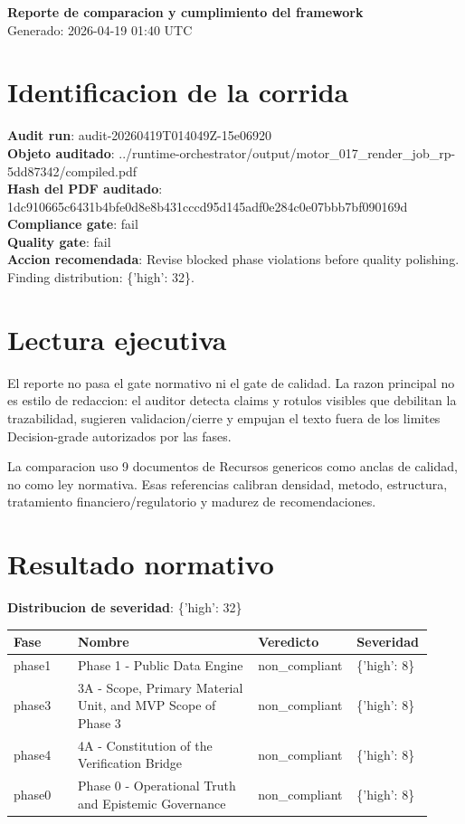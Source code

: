\documentclass[11pt]{article}
\begin{document}
\begin{center}
{\Large \textbf{Reporte de comparacion y cumplimiento del framework}}\\
\vspace{4pt}
Generado: 2026-04-19 01:40 UTC
\end{center}
\section*{Identificacion de la corrida}
\textbf{Audit run}: audit-20260419T014049Z-15e06920\\
\textbf{Objeto auditado}: ../runtime-orchestrator/output/motor\_017\_render\_job\_rp-5dd87342/compiled.pdf\\
\textbf{Hash del PDF auditado}: 1dc910665c6431b4bfe0d8e8b431cccd95d145adf0e284c0e07bbb7bf090169d\\
\textbf{Compliance gate}: fail\\
\textbf{Quality gate}: fail\\
\textbf{Accion recomendada}: Revise blocked phase violations before quality polishing. Finding distribution: \{'high': 32\}.\\
\section*{Lectura ejecutiva}
El reporte no pasa el gate normativo ni el gate de calidad. La razon principal no es estilo de redaccion: el auditor detecta claims y rotulos visibles que debilitan la trazabilidad, sugieren validacion/cierre y empujan el texto fuera de los limites Decision-grade autorizados por las fases.

La comparacion uso 9 documentos de Recursos genericos como anclas de calidad, no como ley normativa. Esas referencias calibran densidad, metodo, estructura, tratamiento financiero/regulatorio y madurez de recomendaciones.
\section*{Resultado normativo}
\textbf{Distribucion de severidad}: \{'high': 32\}\\
\begin{longtable}{>{\raggedright\arraybackslash}p{0.15\linewidth}>{\raggedright\arraybackslash}p{0.42\linewidth}>{\raggedright\arraybackslash}p{0.18\linewidth}>{\raggedright\arraybackslash}p{0.17\linewidth}}
\textbf{Fase} & \textbf{Nombre} & \textbf{Veredicto} & \textbf{Severidad}\\ \hline
phase1 & Phase 1 - Public Data Engine & non\_compliant & \{'high': 8\}\\
phase3 & 3A - Scope, Primary Material Unit, and MVP Scope of Phase 3 & non\_compliant & \{'high': 8\}\\
phase4 & 4A - Constitution of the Verification Bridge & non\_compliant & \{'high': 8\}\\
phase0 & Phase 0 - Operational Truth and Epistemic Governance & non\_compliant & \{'high': 8\}\\
\end{longtable}
\end{document}
